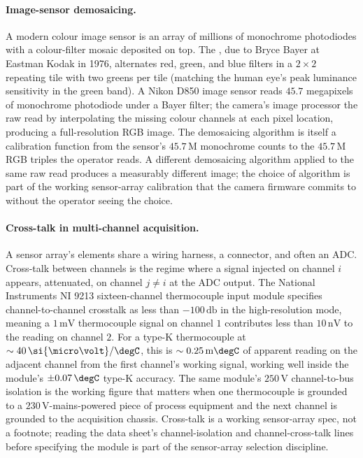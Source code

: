 \paragraph{Image-sensor demosaicing.}
A modern colour image sensor is an array of millions of monochrome
photodiodes with a colour-filter mosaic deposited on top. The
, due to Bryce Bayer at Eastman Kodak in
1976, alternates red, green, and blue filters in a $2 \times 2$
repeating tile with two greens per tile (matching the human eye's
peak luminance sensitivity in the green band). A Nikon D850 image
sensor reads $45.7$ megapixels of monochrome photodiode under a
Bayer filter; the camera's image processor  the
raw read by interpolating the missing colour channels at each pixel
location, producing a full-resolution RGB image. The demosaicing
algorithm is itself a calibration function from the sensor's
$45.7\,\text{M}$ monochrome counts to the $45.7\,\text{M}$
RGB triples the operator reads. A different demosaicing algorithm
applied to the same raw read produces a measurably different image;
the choice of algorithm is part of the working sensor-array
calibration that the camera firmware commits to without the operator
seeing the choice.

\paragraph{Cross-talk in multi-channel acquisition.}
A sensor array's elements share a wiring harness, a connector, and
often an ADC. Cross-talk between channels is the regime where a
signal injected on channel $i$ appears, attenuated, on channel
$j \ne i$ at the ADC output. The National Instruments NI 9213
sixteen-channel thermocouple input module
\cite{text:ch05t3-ni-9213-datasheet} specifies channel-to-channel
crosstalk as less than $-100 \,\si{\decibel}$ in the high-resolution
mode, meaning a $1 \,\si{\milli\volt}$ thermocouple signal on
channel $1$ contributes less than $10 \,\si{\nano\volt}$ to the
reading on channel $2$. For a type-K thermocouple at $\sim 40 \,\si
{\micro\volt}/\degC$, this is $\sim 0.25\,\text{m}\degC$ of
apparent reading on the adjacent channel from the first channel's
working signal, working well inside the module's $\pm 0.07 \,\degC$
type-K accuracy. The same module's $250 \,\si{\volt}$
channel-to-bus isolation is the working figure that matters when
one thermocouple is grounded to a $230 \,\si{\volt}$-mains-powered
piece of process equipment and the next channel is grounded to the
acquisition chassis. Cross-talk is a working sensor-array spec, not
a footnote; reading the data sheet's channel-isolation and
channel-cross-talk lines before specifying the module is part of
the sensor-array selection discipline.

